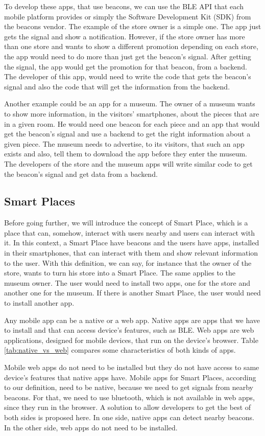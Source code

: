 To develop these apps, that use beacons, we can use the 
BLE API that each 
mobile platform provides or simply the Software
Development Kit (SDK) from the 
beacons vendor. The example of the store owner is a
simple one. The app just gets the signal and show a 
notification. However, if the store owner has more than
one store and wants to show a different promotion depending
on each store, the app would need to do more than just get
the beacon's signal. After getting the signal, the app
would get the promotion for that beacon, from a 
backend. The developer of this app, would need to
write the code that gets the beacon's signal and also
the code that will get the information from the backend.

Another example could be an app for a museum. The owner
of a museum wants to show more information, in the 
visitors' smartphones, about the pieces that are in a given
room. He would need one beacon for each piece and an app
that would get the beacon's signal and use a
backend to get the right information about a given piece.
The museum needs to advertise, to its visitors, that such
an app exists and also, tell them to download the app
before they enter the museum. The developers of the
store and the museum apps will write similar code to get
the beacon's signal and get data from a backend.

\subsection{Smart Places}
\label{sub:smart_places}
Before going further, we will introduce the concept of
Smart Place, which is a place that can, somehow,
interact with users nearby and users can interact 
with it.
In this context, a Smart Place have beacons and the users
have apps, installed in their smartphones, that can interact
with them and show relevant information to the user.
With this definition, we can say, for instance
that the owner of the store, wants to
turn his store into a Smart Place.
The same applies to the museum owner.
The user would need to install two apps, one for the
store and another one for the museum.
If there is another Smart Place, the user would need to
install another app.

Any mobile app can be a native or a web app. Native apps
are apps that we have to install and that can access
device's features, such as BLE. Web apps are web
applications, designed for mobile devices, that run
on the device's browser. Table \ref{tab:native_vs_web}
compares some characteristics of both kinds of apps.

Mobile web apps do not need to be
installed but they do not have access
to same device's features that native apps have.
Mobile apps for Smart Places, according to our definition,
need to be native, because we need to get signals from
nearby beacons. For that, we need to use bluetooth, which is
not available in web apps, since they run in the browser.
A solution to allow developers to get the best of both sides
is proposed here. In one side,
native apps can detect nearby beacons. In the other side,
web apps do not need to be installed.

